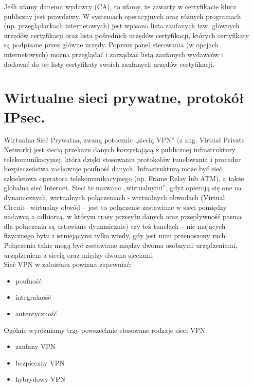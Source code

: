 \documentclass[main.tex]{subfiles}
\begin{document}
    Jeśli ufamy danemu wydawcy (CA), to ufamy, że zawarty w certyfikacie klucz publiczny jest prawdziwy.
    W systemach operacyjnych oraz różnych programach (np. przeglądarkach internetowych)
    jest wpisana lista zaufanych tzw. głównych urzędów certyfikacji oraz lista pośrednich
    urzędów certyfikacji, których certyfikaty są podpisane przez główne urzędy. Poprzez panel
    sterowania (w opcjach internetowych) można przeglądać i zarządzać listą zaufanych
    wydawców i dodawać do tej listy certyfikaty swoich zaufanych urzędów certyfikacji.

    \newpage
    \section{Wirtualne sieci prywatne, protokół IPsec.}
    Wirtualna Sieć Prywatna, zwaną potocznie „siecią VPN” (z ang. Virtual Private Network) jest siecią przekazu danych korzystającą z publicznej infrastruktury telekomunikacyjnej, która dzięki stosowaniu protokołów tunelowania i procedur bezpieczeństwa zachowuje poufność danych. Infrastrukturą może być sieć szkieletowa operatora telekomunikacyjnego (np. Frame Relay lub ATM), a także globalna sieć Internet. Sieci te nazwano „wirtualnymi”, gdyż opierają się one na dynamicznych, wirtualnych połączeniach - wirtualnych obwodach (Virtual Circuit– wirtualny obwód – jest to połączenie zestawiane w sieci pomiędzy nadawcą a odbiorcą, w którym trasy przesyłu danych oraz przepływność pasma dla połączenia są ustawiane dynamicznie) czy też tunelach – nie mających fizycznego bytu i istniejącymi tylko wtedy, gdy jest nimi przenoszony ruch. Połączenia takie mogą być zestawiane między dwoma osobnymi urządzeniami, urządzeniem a siecią oraz między dwoma sieciami.\\
    Sieć VPN w założeniu powinna zapewniać:
    \begin{itemize}
        \item poufność
        \item integralność
        \item autentyczność
    \end{itemize}

    Ogólnie wyróżniamy trzy powszechnie stosowane rodzaje sieci VPN:
    \begin{itemize}
        \item zaufany VPN
        \item bezpieczny VPN
        \item hybrydowy VPN
    \end{itemize}
\end{document}
